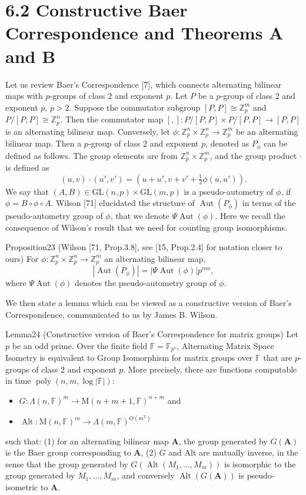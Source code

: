 \section*{6.2 Constructive Baer Correspondence and Theorems A and B}
Let us review Baer's Correspondence [7], which connects alternating bilinear maps with $p$-groups of class 2 and exponent $p$. Let $P$ be a $p$-group of class 2 and exponent $p$, $p>2$. Suppose the commutator subgroup $[P,P]\cong\mathbb Z_p^m$ and $P/[P,P]\cong\mathbb Z_p^n$. Then the commutator map $[,]:P/[P,P]\times P/[P,P]\to[P,P]$ is an alternating bilinear map. Conversely, let $\phi:\mathbb Z_p^n\times\mathbb Z_p^n\to\mathbb Z_p^m$ be an alternating bilinear map. Then a $p$-group of class 2 and exponent $p$, denoted as $P_\phi$ can be defined as follows. The group elements are from $\mathbb Z_p^n\times\mathbb Z_p^m$, and the group product $\cdot$ is defined as
\[(u,v)\cdot(u',v')=(u+u',v+v'+\tfrac12\phi(u,u')).\]
We say that $(A,B)\in\mathrm{GL}(n,p)\times\mathrm{GL}(m,p)$ is a pseudo-autometry of $\phi$, if $\phi=B\circ\phi\circ A$. Wilson [71] elucidated the structure of $\operatorname{Aut}(P_\phi)$ in terms of the pseudo-autometry group of $\phi$, that we denote $\Psi\operatorname{Aut}(\phi)$. Here we recall the consequence of Wilson's result that we need for counting group isomorphisms.
\begin{authorclaim}{Proposition23 (Wilson [71, Prop.3.8], see [15, Prop.2.4] for notation closer to ours)}
For $\phi:\mathbb Z_p^n\times\mathbb Z_p^n\to\mathbb Z_p^m$ an alternating bilinear map,
\[|\operatorname{Aut}(P_\phi)|=|\Psi\operatorname{Aut}(\phi)|p^{nm},\]
where $\Psi\operatorname{Aut}(\phi)$ denotes the pseudo-autometry group of $\phi$.
\end{authorclaim}
We then state a lemma which can be viewed as a constructive version of Baer's Correspondence, communicated to us by James B. Wilson.
\begin{authorclaim}{Lemma24 (Constructive version of Baer's Correspondence for matrix groups)}
Let $p$ be an odd prime. Over the finite field $\mathbb F=\mathbb F_{p^e}$, Alternating Matrix Space Isometry is equivalent to Group Isomorphism for matrix groups over $\mathbb F$ that are $p$-groups of class 2 and exponent $p$. More precisely, there are functions computable in time $\operatorname{poly}(n,m,\log|\mathbb F|)$:
\begin{itemize}
\item $G:\Lambda(n,\mathbb F)^m\to\mathrm M(n+m+1,\mathbb F)^{n+m}$ and
\item $\operatorname{Alt}:\mathrm M(n,\mathbb F)^m\to\Lambda(m,\mathbb F)^{O(m^2)}$
\end{itemize}
such that: (1) for an alternating bilinear map $\mathbf A$, the group generated by $G(\mathbf A)$ is the Baer group corresponding to $\mathbf A$, (2) $G$ and Alt are mutually inverse, in the sense that the group generated by $G(\operatorname{Alt}(M_1,\ldots,M_m))$ is isomorphic to the group generated by $M_1,\ldots,M_m$, and conversely $\operatorname{Alt}(G(\mathbf A))$ is pseudo-isometric to $\mathbf A$.
\end{authorclaim}
